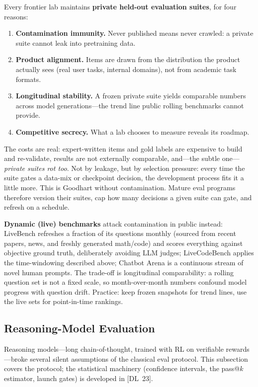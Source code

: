 Every frontier lab maintains \textbf{private held-out evaluation suites}, for
four reasons:
\begin{enumerate}[label=(\arabic*)]
    \item \textbf{Contamination immunity.}  Never published means never
          crawled: a private suite cannot leak into pretraining data.
    \item \textbf{Product alignment.}  Items are drawn from the distribution
          the product actually sees (real user tasks, internal domains), not
          from academic task formats.
    \item \textbf{Longitudinal stability.}  A frozen private suite yields
          comparable numbers across model generations---the trend line public
          rolling benchmarks cannot provide.
    \item \textbf{Competitive secrecy.}  What a lab chooses to measure reveals
          its roadmap.
\end{enumerate}
The costs are real: expert-written items and gold labels are expensive to
build and re-validate, results are not externally comparable, and---the subtle
one---\emph{private suites rot too}.  Not by leakage, but by selection
pressure: every time the suite gates a data-mix or checkpoint decision, the
development process fits it a little more.  This is Goodhart without
contamination.  Mature eval programs therefore version their suites, cap how
many decisions a given suite can gate, and refresh on a schedule.

\textbf{Dynamic (live) benchmarks} attack contamination in public instead:
LiveBench refreshes a fraction of its questions monthly (sourced from recent
papers, news, and freshly generated math/code) and scores everything against
objective ground truth, deliberately avoiding LLM judges; LiveCodeBench
applies the time-windowing described above; Chatbot Arena is a continuous
stream of novel human prompts.  The trade-off is longitudinal comparability:
a rolling question set is not a fixed scale, so month-over-month numbers
confound model progress with question drift.  Practice: keep frozen snapshots
for trend lines, use the live sets for point-in-time rankings.

\subsection{Reasoning-Model Evaluation}
\label{sec:reasoning_eval}

Reasoning models---long chain-of-thought, trained with RL on verifiable
rewards---broke several silent assumptions of the classical eval protocol.
This subsection covers the protocol; the statistical machinery (confidence
intervals, the pass@$k$ estimator, launch gates) is developed in [DL~23].


